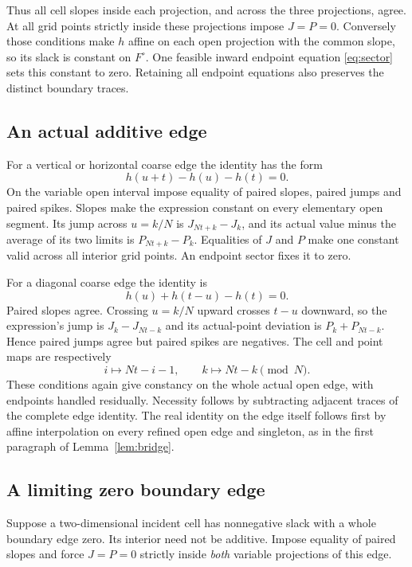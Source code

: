 \documentclass[11pt]{article}
\begin{document}
Thus all cell slopes inside each projection, and across the three projections, agree. At all grid points strictly inside these projections impose $J=P=0$. Conversely those conditions make $h$ affine on each open projection with the common slope, so its slack is constant on $F^\circ$. One feasible inward endpoint equation \eqref{eq:sector} sets this constant to zero. Retaining all endpoint equations also preserves the distinct boundary traces.

\subsection{An actual additive edge}
For a vertical or horizontal coarse edge the identity has the form
\[
 h(u+t)-h(u)-h(t)=0.
\]
On the variable open interval impose equality of paired slopes, paired jumps and paired spikes. Slopes make the expression constant on every elementary open segment. Its jump across $u=k/N$ is $J_{Nt+k}-J_k$, and its actual value minus the average of its two limits is $P_{Nt+k}-P_k$. Equalities of $J$ and $P$ make one constant valid across all interior grid points. An endpoint sector fixes it to zero.

For a diagonal coarse edge the identity is
\[
 h(u)+h(t-u)-h(t)=0.
\]
Paired slopes agree. Crossing $u=k/N$ upward crosses $t-u$ downward, so the expression's jump is $J_k-J_{Nt-k}$ and its actual-point deviation is $P_k+P_{Nt-k}$. Hence paired jumps agree but paired spikes are negatives. The cell and point maps are respectively
\begin{equation}\label{eq:reflect}
 i\longmapsto Nt-i-1,\qquad k\longmapsto Nt-k\pmod N.
\end{equation}
These conditions again give constancy on the whole actual open edge, with endpoints handled residually. Necessity follows by subtracting adjacent traces of the complete edge identity. The real identity on the edge itself follows first by affine interpolation on every refined open edge and singleton, as in the first paragraph of Lemma~\ref{lem:bridge}.

\subsection{A limiting zero boundary edge}
Suppose a two-dimensional incident cell has nonnegative slack with a whole boundary edge zero. Its interior need not be additive. Impose equality of paired slopes and force $J=P=0$ strictly inside \emph{both} variable projections of this edge.
\end{document}
